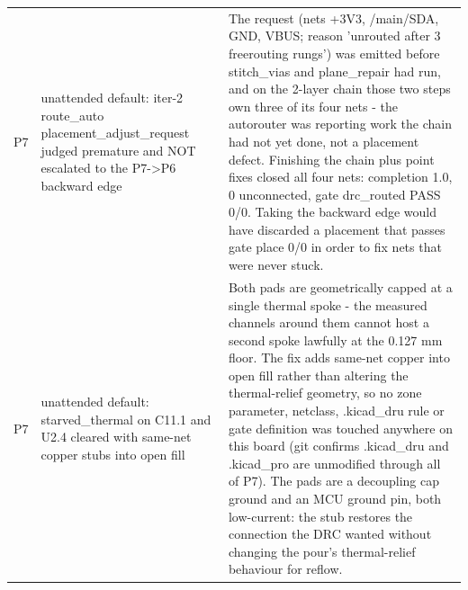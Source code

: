 \documentclass[11pt,a4paper]{article}
\begin{document}
{\begin{longtable}{lp{5.2cm}p{7.2cm}}
P7 & unattended default: iter-2 route\_auto placement\_adjust\_request judged premature and NOT escalated to the P7-\textgreater{}P6 backward edge & The request (nets +3V3, /main/SDA, GND, VBUS; reason 'unrouted after 3 freerouting rungs') was emitted before stitch\_vias and plane\_repair had run, and on the 2-layer chain those two steps own three of its four nets - the autorouter was reporting work the chain had not yet done, not a placement defect. Finishing the chain plus point fixes closed all four nets: completion 1.0, 0 unconnected, gate drc\_routed PASS 0/0. Taking the backward edge would have discarded a placement that passes gate place 0/0 in order to fix nets that were never stuck. \\
P7 & unattended default: starved\_thermal on C11.1 and U2.4 cleared with same-net copper stubs into open fill & Both pads are geometrically capped at a single thermal spoke - the measured channels around them cannot host a second spoke lawfully at the 0.127 mm floor. The fix adds same-net copper into open fill rather than altering the thermal-relief geometry, so no zone parameter, netclass, .kicad\_dru rule or gate definition was touched anywhere on this board (git confirms .kicad\_dru and .kicad\_pro are unmodified through all of P7). The pads are a decoupling cap ground and an MCU ground pin, both low-current: the stub restores the connection the DRC wanted without changing the pour's thermal-relief behaviour for reflow. \\

\end{longtable}}
\end{document}
